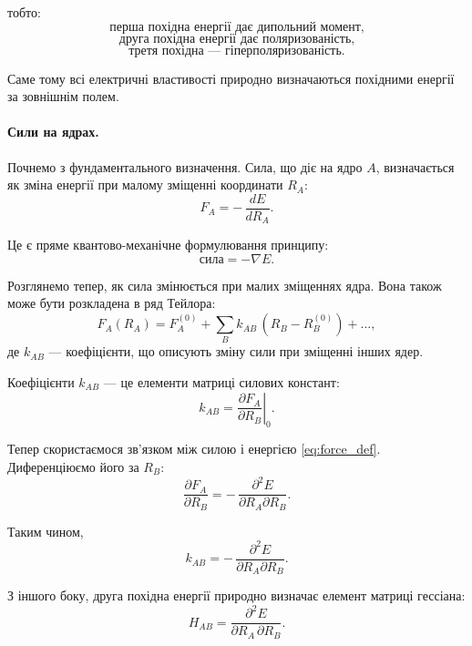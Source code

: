 тобто:
\[
	\text{перша похідна енергії дає дипольний момент,}
\]
\[
	\text{друга похідна енергії дає поляризованість,}
\]
\[
	\text{третя похідна --- гіперполяризованість.}
\]

Саме тому всі електричні властивості природно визначаються
похідними енергії за зовнішнім полем.

\paragraph{Сили на ядрах.}

Почнемо з фундаментального визначення.
Сила, що діє на ядро $A$, визначається як зміна енергії при малому зміщенні
координати $R_A$:
\begin{equation}
	F_A = -\,\frac{dE}{dR_A}.
	\label{eq:force_def}
\end{equation}

Це є пряме квантово-механічне формулювання принципу:
\[
	\text{сила} = -\nabla E.
\]

Розглянемо тепер, як сила змінюється при малих зміщеннях ядра.
Вона також може бути розкладена в ряд Тейлора:
\begin{equation}
	F_A(R_A)
	=
	F_A^{(0)}
	+
	\sum_B k_{AB}\,(R_B - R_B^{(0)})
	+
	\dots ,
	\label{eq:force_Taylor}
\end{equation}
де $k_{AB}$ --- коефіцієнти, що описують зміну сили при зміщенні інших ядер.

Коефіцієнти $k_{AB}$ --- це елементи матриці силових констант:
\begin{equation}
	k_{AB} = \left.\frac{\partial F_A}{\partial R_B}\right|_{0}.
	\label{eq:force_constants_def}
\end{equation}

Тепер скористаємося зв’язком між силою і енергією \eqref{eq:force_def}.
Диференціюємо його за $R_B$:
\begin{equation}
	\frac{\partial F_A}{\partial R_B}
	=
	-\,\frac{\partial^2 E}{\partial R_A \partial R_B}.
	\label{eq:F_derivative_relation}
\end{equation}

Таким чином,
\[
	k_{AB} = -\,\frac{\partial^2 E}{\partial R_A \partial R_B}.
\]

З іншого боку, друга похідна енергії природно визначає елемент матриці гессіана:
\begin{equation}
	H_{AB} =
	\frac{\partial^2 E}{\partial R_A\,\partial R_B}.
	\label{eq:nuclear_Hessian_def_fixed}
\end{equation}

